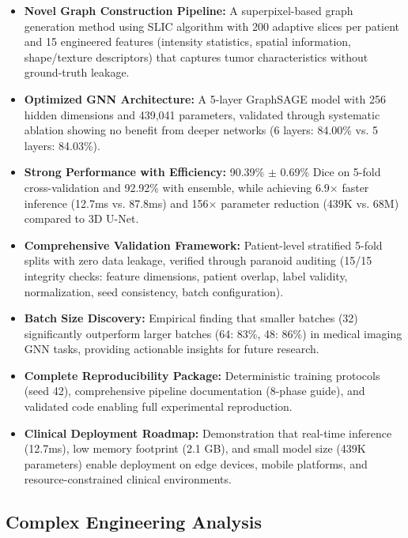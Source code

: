 \begin{itemize}

    \item \textbf{Novel Graph Construction Pipeline:} A superpixel-based graph generation method using SLIC algorithm with 200 adaptive slices per patient and 15 engineered features (intensity statistics, spatial information, shape/texture descriptors) that captures tumor characteristics without ground-truth leakage.
    
    \item \textbf{Optimized GNN Architecture:} A 5-layer GraphSAGE model with 256 hidden dimensions and 439,041 parameters, validated through systematic ablation showing no benefit from deeper networks (6 layers: 84.00\% vs. 5 layers: 84.03\%).
    
    \item \textbf{Strong Performance with Efficiency:} 90.39\% $\pm$ 0.69\% Dice on 5-fold cross-validation and 92.92\% with ensemble, while achieving 6.9$\times$ faster inference (12.7ms vs. 87.8ms) and 156$\times$ parameter reduction (439K vs. 68M) compared to 3D U-Net.
    
    \item \textbf{Comprehensive Validation Framework:} Patient-level stratified 5-fold splits with zero data leakage, verified through paranoid auditing (15/15 integrity checks: feature dimensions, patient overlap, label validity, normalization, seed consistency, batch configuration).
    
    \item \textbf{Batch Size Discovery:} Empirical finding that smaller batches (32) significantly outperform larger batches (64: 83\%, 48: 86\%) in medical imaging GNN tasks, providing actionable insights for future research.
    
    \item \textbf{Complete Reproducibility Package:} Deterministic training protocols (seed 42), comprehensive pipeline documentation (8-phase guide), and validated code enabling full experimental reproduction.
    
    \item \textbf{Clinical Deployment Roadmap:} Demonstration that real-time inference (12.7ms), low memory footprint (2.1 GB), and small model size (439K parameters) enable deployment on edge devices, mobile platforms, and resource-constrained clinical environments.
\end{itemize}


\subsection{Complex Engineering Analysis}

